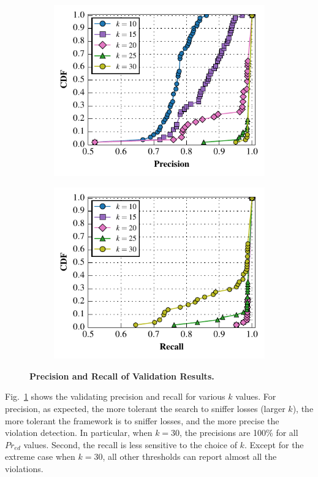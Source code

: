 \begin{figure}[t!]
  \centering
  \begin{subfigure}{0.48\textwidth}
    \includegraphics[width=\textwidth]{./figures/scripts/PrecisionFigure.pdf}
  \end{subfigure}
  \begin{subfigure}{0.48\textwidth}
    \includegraphics[width=\textwidth]{./figures/scripts/RecallFigure.pdf}
  \end{subfigure}
  \caption{\textbf{Precision and Recall of Validation Results.}}
  \label{fig:precision}
  \vspace*{-5mm}
\end{figure}

Fig.~\ref{fig:precision} shows the validating precision and recall for various
$k$ values. For precision, as expected, the more tolerant the search to sniffer
losses (larger $k$), the more tolerant the framework is to sniffer losses, and
the more precise the violation detection. In particular, when $k=30$, the
precisions are 100\% for all $Pr_{ed}$ values. Second, the recall is less
sensitive to the choice of $k$.  Except for the extreme case when $k=30$, all
other thresholds can report almost all the violations.
